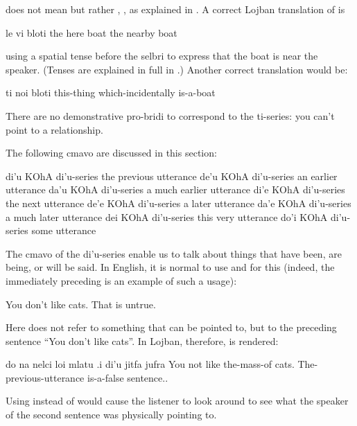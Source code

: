 {\noindent}does not mean  but rather ,
    , as explained in . A correct Lojban translation
    of  is
\begin{example}
le vi bloti\n
the here boat\n
the nearby boat
\end{example}

{\noindent}using a spatial tense before the selbri  to express
    that the boat is near the speaker. (Tenses are explained in
    full in .) Another correct
    translation would be:
\begin{example}
ti noi bloti\n
this-thing which-incidentally is-a-boat
\end{example}

There are no demonstrative pro-bridi to correspond to the
    ti-series: you can't point to a relationship.



The following cmavo are discussed in this section:

   di'u    KOhA    di'u-series the previous utterance
    de'u    KOhA    di'u-series an earlier utterance
    da'u    KOhA    di'u-series a much earlier utterance
    di'e    KOhA    di'u-series the next utterance
    de'e    KOhA    di'u-series a later utterance
    da'e    KOhA    di'u-series a much later utterance
    dei KOhA    di'u-series this very utterance
    do'i    KOhA    di'u-series some utterance

The cmavo of the di'u-series enable us to talk about things
    that have been, are being, or will be said. In English, it is
    normal to use  and  for this (indeed, the
    immediately preceding  is an example of such a usage):
\begin{example}
You don't like cats.\n
That is untrue.
\end{example}

Here  does not refer to something that can be
    pointed to, but to the preceding sentence ``You don't like
    cats''. In Lojban, therefore, 
    is rendered:
\begin{example}
do na nelci loi mlatu\n
\T	.i di'u jitfa jufra\n
You not like the-mass-of cats.\n
\T	The-previous-utterance is-a-false sentence..
\end{example}

Using  instead of  would cause the listener to
    look around to see what the speaker of the second sentence was
    physically pointing to. 

